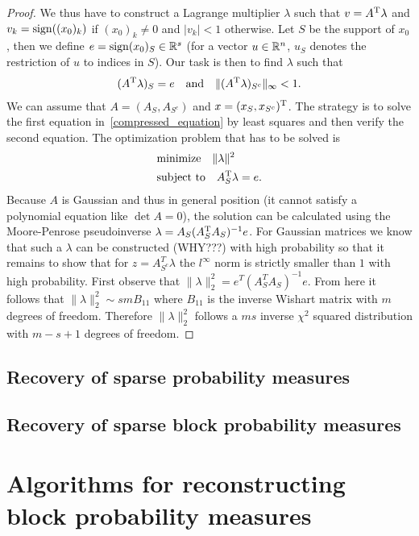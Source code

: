 \documentclass{article} %
\begin{document}
\begin{proof}
   We thus have to construct
  a Lagrange multiplier $\lambda$ such that $v = A^{\rm T} \lambda$ and $v_k = \operatorname{sign}((x_0)_k)$ if $(x_0)_k\neq 0$ and $|v_k| < 1$ otherwise. Let $S$ be the support of $x_0$, then we define $e = \operatorname{sign}(x_0)_S\in \mathbb{R}^s$ (for a vector $u\in \mathbb{R}^n$, $u_S$ denotes the restriction of $u$ to indices in $S$). Our task is then to find $\lambda$ such that
  \begin{align}\label{compressed_equation}
  (A^{\rm T} \lambda)_S = e\quad\text{and}\quad \lVert(A^{\rm T} \lambda)_{S^c}\rVert_\infty < 1.
  \end{align}
  We can assume that $A = (A_S, A_{S^c})$ and $x = (x_S, x_{S^c})^{\rm T}$. The strategy is to solve the first equation in~\eqref{compressed_equation} by least squares and then verify the second equation. The optimization problem that has to be solved is
  \begin{align*}
    &\text{minimize}\quad \lVert\lambda\rVert^2\\
    &\text{subject to}\quad A_S^{\rm T} \lambda = e.
  \end{align*}
    Because $A$ is Gaussian and thus in general position (it cannot satisfy a polynomial equation like $\det A = 0$), the solution can be calculated using the Moore-Penrose pseudoinverse $\lambda = A_S(A_S^{\rm T} A_S)^{-1} e$. For Gaussian matrices we know that such a $\lambda$ can be constructed (WHY???) with high probability so that it remains to show that for $z = A_{S^c}^T\lambda$ the $l^{\infty}$ norm is strictly smaller than $1$ with high probability. First observe that $\|\lambda\|_2^2 = e^T(A_S^TA_S)^{-1} e$. From here it follows that $\|\lambda\|_2^2 \sim smB_{11}$ where $B_{11}$ is the inverse Wishart matrix with $m$ degrees of freedom. Therefore $\|\lambda\|_2^2$ follows a $ms$ inverse $\chi^2$ squared distribution with $m-s+1$ degrees of freedom.  
    \end{proof}

\subsection{Recovery of sparse probability measures}
\subsection{Recovery of sparse block probability measures}
\section{Algorithms for reconstructing block probability measures}
\end{document}
